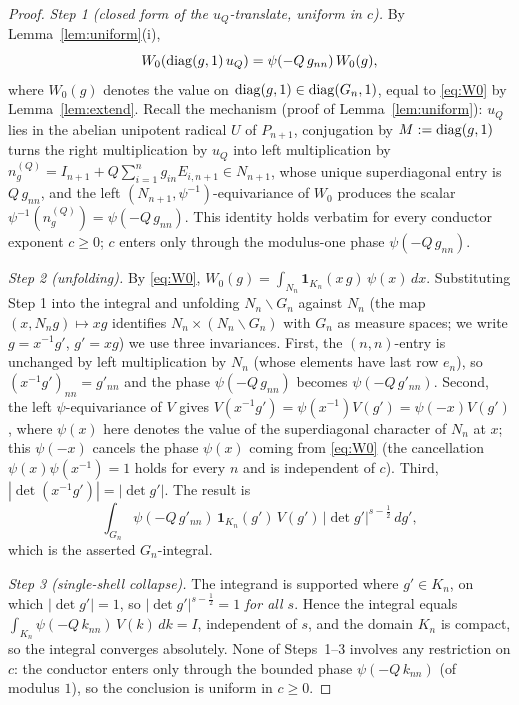 \begin{proof}
\emph{Step 1 \textup{(}closed form of the $u_Q$-translate, uniform in $c$\textup{)}.}
By Lemma~\ref{lem:uniform}(i),
\[
W_0(\operatorname{diag}(g,1)\,u_Q)=\psi(-Q\,g_{nn})\,W_0(g),
\]
where $W_0(g)$ denotes the value on $\operatorname{diag}(g,1)\in\operatorname{diag}(G_n,1)$, equal to \eqref{eq:W0}
by Lemma~\ref{lem:extend}. Recall the mechanism \textup{(}proof of Lemma~\ref{lem:uniform}\textup{)}:
$u_Q$ lies in the abelian unipotent radical $U$ of $P_{n+1}$, conjugation by $M:=\operatorname{diag}(g,1)$
turns the right multiplication by $u_Q$ into left multiplication by
$n_g^{(Q)}=I_{n+1}+Q\sum_{i=1}^{n}g_{in}E_{i,n+1}\in N_{n+1}$, whose unique superdiagonal entry is
$Q\,g_{nn}$, and the left $(N_{n+1},\psi^{-1})$-equivariance of $W_0$ produces the scalar
$\psi^{-1}(n_g^{(Q)})=\psi(-Q\,g_{nn})$. This identity holds verbatim for every conductor
exponent $c\ge0$; $c$ enters only through the modulus-one phase $\psi(-Q\,g_{nn})$.

\emph{Step 2 \textup{(}unfolding\textup{)}.}
By \eqref{eq:W0}, $W_0(g)=\int_{N_n}\mathbf 1_{K_n}(x\,g)\,\psi(x)\,dx$. Substituting Step 1 into
the integral and unfolding $N_n\backslash G_n$ against $N_n$ \textup{(}the map
$(x,N_ng)\mapsto xg$ identifies $N_n\times(N_n\backslash G_n)$ with $G_n$ as measure spaces; we
write $g=x^{-1}g'$, $g'=xg$\textup{)} we use three invariances. First, the $(n,n)$-entry is
unchanged by left multiplication by $N_n$ \textup{(}whose elements have last row $e_n$\textup{)},
so $(x^{-1}g')_{nn}=g'_{nn}$ and the phase $\psi(-Q\,g_{nn})$ becomes $\psi(-Q\,g'_{nn})$.
Second, the left $\psi$-equivariance of $V$ gives
$V(x^{-1}g')=\psi(x^{-1})V(g')=\psi(-x)V(g')$, where $\psi(x)$ here denotes the value of the
superdiagonal character of $N_n$ at $x$; this $\psi(-x)$ cancels the phase $\psi(x)$ coming from
\eqref{eq:W0} \textup{(}the cancellation $\psi(x)\psi(x^{-1})=1$ holds for every $n$ and is
independent of $c$\textup{)}. Third, $|\det(x^{-1}g')|=|\det g'|$. The result is
\[
\int_{G_n}\psi(-Q\,g'_{nn})\,\mathbf 1_{K_n}(g')\,V(g')\,|\det g'|^{s-\frac12}\,dg' ,
\]
which is the asserted $G_n$-integral.

\emph{Step 3 \textup{(}single-shell collapse\textup{)}.}
The integrand is supported where $g'\in K_n$, on which $|\det g'|=1$, so $|\det g'|^{s-\frac12}=1$
\emph{for all $s$}. Hence the integral equals
$\int_{K_n}\psi(-Q\,k_{nn})\,V(k)\,dk=I$, independent of $s$, and the domain $K_n$ is compact, so
the integral converges absolutely. None of Steps~1--3 involves any restriction on $c$: the
conductor enters only through the bounded phase $\psi(-Q\,k_{nn})$ \textup{(}of modulus $1$\textup{)},
so the conclusion is uniform in $c\ge0$.
\end{proof}


